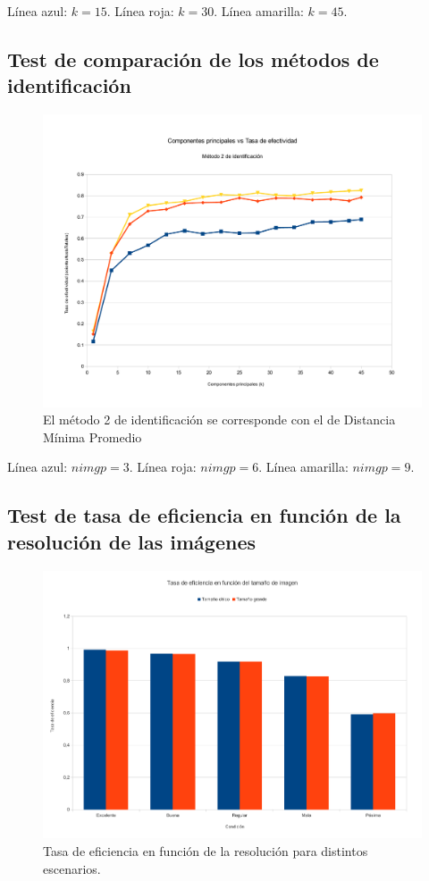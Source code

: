 Línea azul: $k = 15$. Línea roja: $k = 30$. Línea amarilla: $k = 45$.

\subsection{Test de comparación de los métodos de identificación}
\begin{figure}[H]{}
\centering
\includegraphics[scale=0.5]{graphs/componentesPrincipalesVsTasaDeEfectividadM2.pdf}
\caption{El método 2 de identificación se corresponde con el de Distancia Mínima Promedio}
\label{CPvsTE}
\end{figure}

Línea azul: $nimgp = 3$. Línea roja: $nimgp = 6$. Línea amarilla: $nimgp = 9$.

\subsection{Test de tasa de eficiencia en función de la resolución de las imágenes}
\begin{figure}[H]{}
\centering
\includegraphics[scale=0.5]{graphs/TEvsRes.pdf}
\caption{Tasa de eficiencia en función de la resolución para distintos escenarios.}
\label{TEvsRes}
\end{figure}
